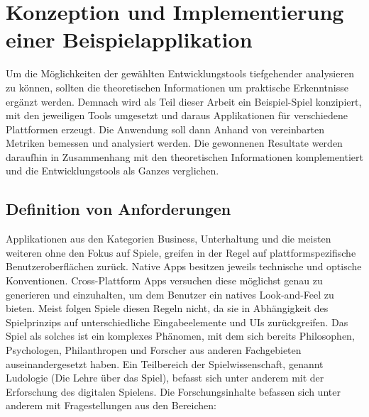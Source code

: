

\chapter{Konzeption und Implementierung einer Beispielapplikation}
Um die Möglichkeiten der gewählten Entwicklungstools tiefgehender analysieren zu können, sollten die theoretischen Informationen um praktische Erkenntnisse ergänzt werden. Demnach wird als Teil dieser Arbeit ein Beispiel-Spiel konzipiert, mit den jeweiligen Tools umgesetzt und daraus Applikationen für verschiedene Plattformen erzeugt. Die Anwendung soll dann Anhand von vereinbarten Metriken bemessen und analysiert werden. Die gewonnenen Resultate werden daraufhin in Zusammenhang mit den theoretischen Informationen komplementiert und die Entwicklungstools als Ganzes verglichen. 

\section{Definition von Anforderungen}
\label{sec:definition_anforderungen}
Applikationen aus den Kategorien Business, Unterhaltung und die meisten weiteren ohne den Fokus auf Spiele, greifen in der Regel auf plattformspezifische Benutzeroberflächen zurück. Native Apps besitzen jeweils technische und optische Konventionen. Cross-Plattform Apps versuchen diese möglichst genau zu generieren und einzuhalten, um dem Benutzer ein natives Look-and-Feel zu bieten. 
Meist folgen Spiele diesen Regeln nicht, da sie in Abhängigkeit des Spielprinzips auf unterschiedliche Eingabeelemente und UIs zurückgreifen. 
Das Spiel als solches ist ein komplexes Phänomen, mit dem sich bereits Philosophen, Psychologen, Philanthropen und Forscher aus anderen Fachgebieten auseinandergesetzt haben. Ein Teilbereich der Spielwissenschaft, genannt Ludologie (Die Lehre über das Spiel), befasst sich unter anderem mit der Erforschung des digitalen Spielens. \citep{ludologie} Die Forschungsinhalte befassen sich unter anderem mit Fragestellungen aus den Bereichen:

